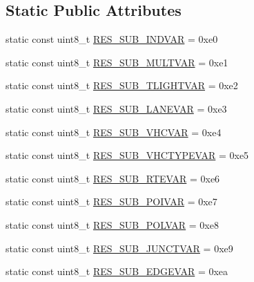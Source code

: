 \subsection*{Static Public Attributes}
\begin{DoxyCompactItemize}
\item 
static const uint8\+\_\+t \hyperlink{classtraci__api_1_1_variable_subscription_a67be7b764a8ec894c712922c1a279439}{R\+E\+S\+\_\+\+S\+U\+B\+\_\+\+I\+N\+D\+V\+AR} = 0xe0
\item 
static const uint8\+\_\+t \hyperlink{classtraci__api_1_1_variable_subscription_a0f5f2ce0123762a95e12e12e4013e43e}{R\+E\+S\+\_\+\+S\+U\+B\+\_\+\+M\+U\+L\+T\+V\+AR} = 0xe1
\item 
static const uint8\+\_\+t \hyperlink{classtraci__api_1_1_variable_subscription_a4770fd303ba47c510f2b898bb61f76bb}{R\+E\+S\+\_\+\+S\+U\+B\+\_\+\+T\+L\+I\+G\+H\+T\+V\+AR} = 0xe2
\item 
static const uint8\+\_\+t \hyperlink{classtraci__api_1_1_variable_subscription_a9edde61a4dd1f4997ba950a86e07650a}{R\+E\+S\+\_\+\+S\+U\+B\+\_\+\+L\+A\+N\+E\+V\+AR} = 0xe3
\item 
static const uint8\+\_\+t \hyperlink{classtraci__api_1_1_variable_subscription_ae3d75ae633ea0a072ccd01543c22515a}{R\+E\+S\+\_\+\+S\+U\+B\+\_\+\+V\+H\+C\+V\+AR} = 0xe4
\item 
static const uint8\+\_\+t \hyperlink{classtraci__api_1_1_variable_subscription_a5bb447d5b748ae629c058e9f3683fa1f}{R\+E\+S\+\_\+\+S\+U\+B\+\_\+\+V\+H\+C\+T\+Y\+P\+E\+V\+AR} = 0xe5
\item 
static const uint8\+\_\+t \hyperlink{classtraci__api_1_1_variable_subscription_aa0855c699d81666db867dbf3fb6f08aa}{R\+E\+S\+\_\+\+S\+U\+B\+\_\+\+R\+T\+E\+V\+AR} = 0xe6
\item 
static const uint8\+\_\+t \hyperlink{classtraci__api_1_1_variable_subscription_aa1733f06f1c969cbbea44c8f7f1eb758}{R\+E\+S\+\_\+\+S\+U\+B\+\_\+\+P\+O\+I\+V\+AR} = 0xe7
\item 
static const uint8\+\_\+t \hyperlink{classtraci__api_1_1_variable_subscription_ab5629c964ed85fabb49291bfa63a0c84}{R\+E\+S\+\_\+\+S\+U\+B\+\_\+\+P\+O\+L\+V\+AR} = 0xe8
\item 
static const uint8\+\_\+t \hyperlink{classtraci__api_1_1_variable_subscription_a681e35cdde9ef1fb500d533e94113064}{R\+E\+S\+\_\+\+S\+U\+B\+\_\+\+J\+U\+N\+C\+T\+V\+AR} = 0xe9
\item 
static const uint8\+\_\+t \hyperlink{classtraci__api_1_1_variable_subscription_acca8676c26bb0d649ea017826749eae0}{R\+E\+S\+\_\+\+S\+U\+B\+\_\+\+E\+D\+G\+E\+V\+AR} = 0xea

\end{DoxyCompactItemize}
